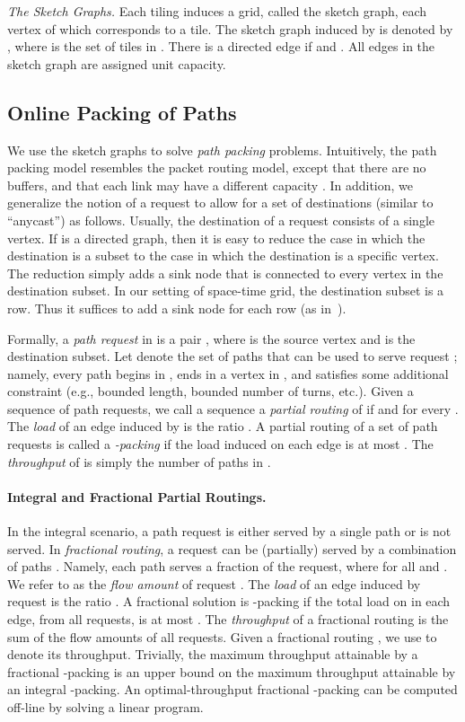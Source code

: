 \documentclass[11pt]{article}
\newenvironment{proof sketch}[1]{\noindent {\emph{Proof sketch of #1:}}}{\hfill \qed}
\begin{document}
\emph{The Sketch Graphs.}  Each tiling  induces a grid, called the sketch graph,
each vertex of which corresponds to a tile. The sketch graph induced by  is
denoted by , where  is the set of tiles in .
There is a directed edge  if  and .  All edges in the sketch graph are assigned unit capacity.


\subsection{Online Packing of Paths}\label{sec:IPP}
We use  the sketch graphs to solve \emph{path packing} problems.
Intuitively, the path packing model resembles the packet routing
model, except that there are no buffers, and that each link  may
have a different capacity .
In addition,  we
generalize the notion of a request to allow for a set of destinations
(similar to ``anycast'') as follows. Usually, the destination of a request consists of a
single vertex. If  is a directed graph, then it is easy to reduce
the case in which the destination is a subset to the case in which
the destination is a specific vertex. The reduction simply adds a
sink node that is connected to every vertex in the destination
subset. In our setting of space-time grid, the destination subset is
a row. Thus it suffices to add a sink node for each row (as in~\cite{AZ}).

Formally, a \emph{path request}  in  is a pair , where 
is the source vertex and  is the destination subset.  Let 
denote the set of paths that can be used to serve request ; namely, every path
 begins in , ends in a vertex in , and satisfies some
additional constraint (e.g., bounded length, bounded number of turns, etc.).  Given a sequence 
of path requests, we call a sequence  a \emph{partial routing}
of  if  and  for every .  The \emph{load} of
an edge  induced by  is the ratio . A partial routing of a set of path requests is called a \emph{-packing} if the
load induced on each edge is at most .  The \emph{throughput} of  is simply
the number  of paths in .

\paragraph{Integral and Fractional Partial Routings\ifnum{}.\fi}
In the integral scenario,
a path request is either  served by a single path or is not served.
In \emph{fractional routing},
a request  can be (partially) served by a combination of paths
. Namely, each path  serves a fraction
 of the request, where  for all
 and  . We refer to  as the \emph{flow
amount} of request . The \emph{load} of an edge  induced by request  is the ratio . A fractional solution is
-packing if the total load on in each edge, from all
requests, is at most .   The \emph{throughput} of a
fractional routing is the sum of the flow amounts of all requests. Given a
fractional routing , we use  to denote its
throughput.
Trivially, the maximum throughput attainable
by a fractional -packing is an upper bound on the maximum
throughput attainable by an integral -packing.  An
optimal-throughput fractional -packing can be computed off-line
by
solving a linear program.
\end{document}
